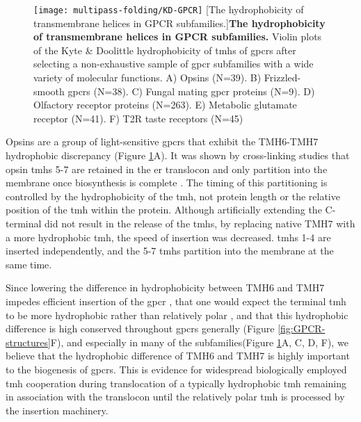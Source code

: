 \begin{figure}[!ht]
\centering
\texttt{[image: multipass-folding/KD-GPCR]}
		[The hydrophobicity of transmembrane helices in GPCR subfamilies.]{\textbf{The hydrophobicity of transmembrane helices in GPCR subfamilies.}
    Violin plots of the Kyte \& Doolittle hydrophobicity \cite{Kyte1982} of \gls{tmh}s of \gls{gpcr}s after selecting a non-exhaustive sample of \gls{gpcr} subfamilies with a wide variety of molecular functions.
    A) Opsins (N=39).
    B) Frizzled-smooth \gls{gpcr}s (N=38).
    C) Fungal mating \gls{gpcr} proteins (N=9).
    D) Olfactory receptor proteins (N=263).
    E) Metabolic glutamate receptor (N=41).
    F) T2R taste receptors (N=45)
    }

\label{fig:KD-GPCR}
\end{figure}

Opsins are a group of light\--sensitive \gls{gpcr}s that exhibit the TMH6\--TMH7 hydrophobic discrepancy (Figure \ref{fig:KD-GPCR}A).
It was shown by cross\--linking studies that opsin \gls{tmh}s 5-7 are retained in the \gls{er} translocon and only partition into the membrane once biosynthesis is complete \cite{Ismail2008}.
The timing of this partitioning is controlled by the hydrophobicity of the \gls{tmh}, not protein length or the relative position of the \gls{tmh} within the protein.
Although artificially extending the C-terminal did not result in the release of the \gls{tmh}s, by replacing native TMH7 with a more hydrophobic \gls{tmh}, the speed of insertion was decreased.
\gls{tmh}s 1-4 are inserted independently, and the 5-7 \gls{tmh}s partition into the membrane at the same time.

Since lowering the difference in hydrophobicity between TMH6 and TMH7 impedes efficient insertion of the \gls{gpcr} \cite{Ismail2008}, that one would expect the terminal \gls{tmh} to be more hydrophobic rather than relatively polar \cite{Virkki2014}, and that this hydrophobic difference is high conserved throughout \gls{gpcr}s generally (Figure \ref{fig:GPCR-structures}F), and especially in many of the subfamilies(Figure \ref{fig:KD-GPCR}A, C, D, F), we believe that the hydrophobic difference of TMH6 and TMH7 is highly important to the biogenesis of \gls{gpcr}s. This is evidence for widespread biologically employed \gls{tmh} cooperation during translocation of a typically hydrophobic \gls{tmh} remaining in association with the translocon until the relatively polar \gls{tmh} is processed by the insertion machinery.


